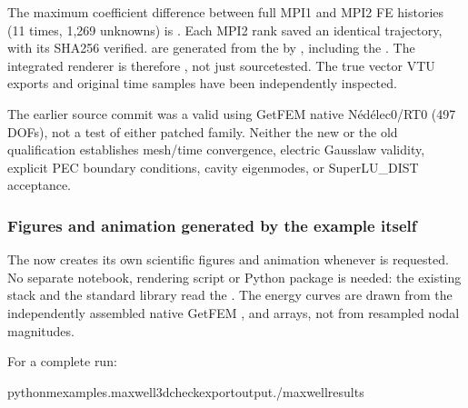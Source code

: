 \documentclass[letterpaper,10pt,english]{sphinxmanual}
\begin{document}
\sphinxAtStartPar
The maximum coefficient difference between
full MPI1 and MPI2 FE histories
(11 times, 1,269 unknowns) is
.
Each MPI2 rank saved an identical
trajectory, with its SHA256 verified.
 are generated from
the  by
,
including the . The integrated renderer is
therefore ,
not just source\sphinxhyphen{}tested. The true vector
VTU exports and original time samples
have been independently inspected.

\sphinxAtStartPar
The earlier source commit 
was a valid  using
GetFEM native Nédélec0/RT0 (497 DOFs),
not a test of either patched family.
Neither the new or the old qualification
establishes mesh/time convergence,
electric Gauss\sphinxhyphen{}law validity, explicit PEC
boundary conditions, cavity eigenmodes,
or SuperLU\_DIST acceptance.


\subsubsection{Figures and animation generated by the example itself}
\label{\detokenize{examples/maxwell_3d:figures-and-animation-generated-by-the-example-itself}}
\sphinxAtStartPar
The  now creates its
own scientific figures and animation whenever
 is requested.
No separate notebook, rendering script or
 Python package is needed: the existing
 stack and the standard library
read the .
The energy curves are drawn from the
independently assembled native GetFEM
,  and  arrays, not from
resampled nodal magnitudes.

\sphinxAtStartPar
For a complete run:

\begin{sphinxVerbatim}[commandchars=\\\{\}]
python\PYGZhy{}mexamples.maxwell\PYGZus{}3d\PYGZhy{}\PYGZhy{}check\PYGZhy{}\PYGZhy{}export\PYGZhy{}\PYGZhy{}output./maxwell\PYGZus{}results
\end{sphinxVerbatim}
\end{document}
